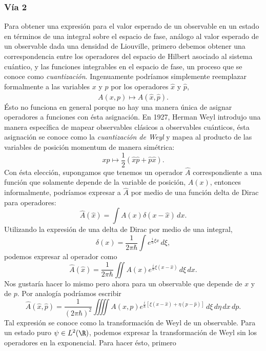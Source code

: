 \subsubsection{Vía 2}

Para obtener una expresión para el valor esperado de un
observable en un estado en términos de una integral sobre
el espacio de fase, análogo al valor esperado de un
observable dada una densidad de Liouville, primero debemos
obtener una correspondencia entre los operadores del
espacio de Hilbert asociado al sistema cuántico, y las
funciones integrables en el espacio de fase, un proceso
que se conoce como \textit{cuantización}.  Ingenuamente
podríamos simplemente reemplazar formalmente a las
variables $x$ y $p$ por los operadores $\hat{x}$ y
$\hat{p}$,
\[
  A(x,p) \mapsto \hat{A}(\hat{x},\hat{p}).
\]
Ésto no funciona en general porque no hay una manera única
de asignar operadores a funciones con ésta asignación. En
1927, Herman Weyl introdujo una manera específica de mapear
observables clásicos a observables cuánticos, ésta
asignación se conoce como la \textit{cuantización de Weyl}
y mapea al producto de las variables de posición momentum
de manera simétrica:
\[
  xp \mapsto \frac{1}{2}\left( \hat{x}\hat{p} +
  \hat{p}\hat{x} \right).
\] 
Con ésta elección, supongamos que tenemos un operador
$\hat{A}$ correspondiente a una función que solamente
depende de la variable de posición, $A(x)$, entonces
informalmente, podríamos expresar a $\hat{A}$ por medio de
una función delta de Dirac para operadores:
\begin{equation}
  \hat{A}(\hat{x})
  = \int A(x) \delta(x-\hat{x}) \, dx.
\end{equation}
Utilizando la expresión de una delta de Dirac por medio de
una integral,
\[
  \delta(x)
  = \frac{1}{2\pi\hbar} \int e^{\frac{i}{\hbar} \xi x} \,
  d\xi,
\] 
podemos expresar al operador como
\[
  \hat{A}(\hat{x})
  = \frac{1}{2\pi\hbar} \iint A(x)e^{\frac{i}{\hbar} \xi
  (x - \hat{x})} \, d\xi \, dx.
\] 
Nos gustaría hacer lo mismo pero ahora para un observable
que depende de $x$ y de $p$. Por analogía podríamos
escribir 
\begin{equation}
  \hat{A}(\hat{x},\hat{p})
  = \frac{1}{(2\pi\hbar)^2} \iiiint A(x,p)
  e^{\frac{i}{\hbar} [\xi (x - \hat{x}) + \eta (p -
  \hat{p})]} \, d\xi \, d\eta \, dx \, dp.
\end{equation}
Tal expresión se conoce como la transformación de Weyl de
un observable. Para un estado puro $\psi \in L^2(\R)$,
podemos expresar la transformación de Weyl sin los
operadores en la exponencial. Para hacer ésto, primero
